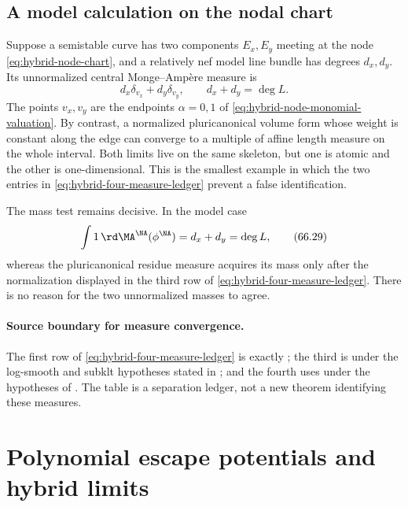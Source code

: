\subsection{A model calculation on the nodal chart}
\label{sec:hybrid-node-measures}

Suppose a semistable curve has two components $E_x,E_y$ meeting at the
node \eqref{eq:hybrid-node-chart}, and a relatively nef model line bundle
has degrees $d_x,d_y$.  Its unnormalized central Monge--Amp\`ere measure is
\[
                     d_x\delta_{v_x}+d_y\delta_{v_y},
                 \qquad d_x+d_y=\deg L.
\tag{66.28}\label{eq:hybrid-node-model-measure}
\]
The points $v_x,v_y$ are the endpoints $\alpha=0,1$ of
\eqref{eq:hybrid-node-monomial-valuation}.  By contrast, a normalized
pluricanonical volume form whose weight is constant along the edge can
converge to a multiple of affine length measure on the whole interval.
Both limits live on the same skeleton, but one is atomic and the other is
one-dimensional.  This is the smallest example in which the two entries in
\eqref{eq:hybrid-four-measure-ledger} prevent a false
identification.

The mass test remains decisive.  In the model case
\[
 \int1\,\rd\MA^{\NA}(\phi^{\NA})=d_x+d_y=\deg L,
\tag{66.29}\label{eq:hybrid-node-mass-test}
\]
whereas the pluricanonical residue measure acquires its mass only after the
normalization displayed in the third row of
\eqref{eq:hybrid-four-measure-ledger}.  There is no reason for the two
unnormalized masses to agree.

\paragraph{Source boundary for measure convergence.}
The first row of \eqref{eq:hybrid-four-measure-ledger} is exactly
\cite[Theorem~4.11]{PS23Hybrid}; the third is
\cite{BJ17Hybrid} under the log-smooth and subklt hypotheses stated in
; and the fourth uses
\cite{PS22HybridKE,PS23Hybrid} under the hypotheses of
.  The table is a separation ledger, not a new theorem
identifying these measures.

\section{Polynomial escape potentials and hybrid limits}
\label{sec:hybrid-polynomial-escape}

